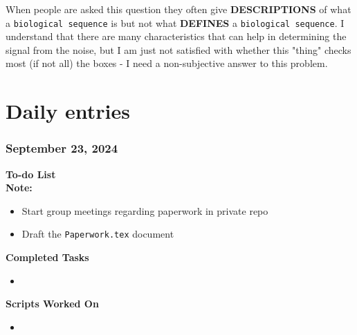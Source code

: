 \documentclass[11pt]{report}
\newcommand{\done}{\checkmark}
\begin{document}
{\begin{tcolorbox}[colback=gray!10!white, coltitle=white, colframe=gray!80!black, title=Biological Information]
	When people are asked this question they often give \textbf{DESCRIPTIONS} of what a \texttt{biological sequence} is but not what \textbf{DEFINES} a \texttt{biological sequence}. I understand that there are many characteristics that can help in determining the signal from the noise, but I am just not satisfied with whether this "thing" checks most (if not all) the boxes - I need a non-subjective answer to this problem. 
\end{tcolorbox}







\setcounter{section}{1}
\setcounter{subsection}{0}


\newpage






\nolinenumbers
\part{Daily entries}

\pagestyle{fancy}
\fancyhf{}
\fancyhead[C]{\leftmark}  %
\fancyhead[R]{\thepage}

\renewcommand{\thesection}{\arabic{section}}
\setcounter{section}{0}
\setcounter{subsection}{0}

\section{September 23, 2024}


\textbf{To-do List} \\
\textbf{Note:} 

\begin{itemize}
	\item [\done] Start group meetings regarding paperwork in private repo
	\item [\done] Draft the \texttt{Paperwork.tex} document

		
\end{itemize}

\textbf{Completed Tasks}
\begin{itemize}
	\item 
\end{itemize}

\textbf{Scripts Worked On}
\begin{itemize}
	\item 
\end{itemize}


}
\end{document}
